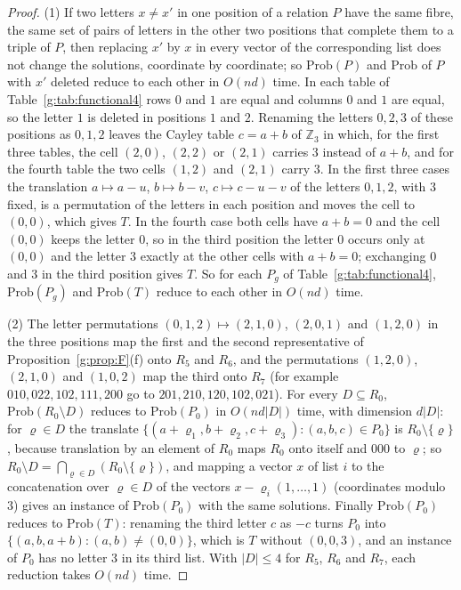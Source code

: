 \documentclass[11pt]{article}
\theoremstyle{definition}
\theoremstyle{remark}
\newcommand{\Z}{\mathbb{Z}}
\newcommand{\Prob}{\mathrm{Prob}}
\begin{document}
\begin{proof}
(1) If two letters $x\ne x'$ in one position of a relation $P$ have the same fibre, the same set of pairs of letters in the other two positions that complete them to a triple of $P$, then replacing $x'$ by $x$ in every vector of the corresponding list does not change the solutions, coordinate by coordinate; so $\Prob(P)$ and $\Prob$ of $P$ with $x'$ deleted reduce to each other in $O(nd)$ time. In each table of Table~\ref{g:tab:functional4} rows $0$ and $1$ are equal and columns $0$ and $1$ are equal, so the letter $1$ is deleted in positions $1$ and $2$. Renaming the letters $0,2,3$ of these positions as $0,1,2$ leaves the Cayley table $c=a+b$ of $\Z_3$ in which, for the first three tables, the cell $(2,0)$, $(2,2)$ or $(2,1)$ carries $3$ instead of $a+b$, and for the fourth table the two cells $(1,2)$ and $(2,1)$ carry $3$. In the first three cases the translation $a\mapsto a-u$, $b\mapsto b-v$, $c\mapsto c-u-v$ of the letters $0,1,2$, with $3$ fixed, is a permutation of the letters in each position and moves the cell to $(0,0)$, which gives $T$. In the fourth case both cells have $a+b=0$ and the cell $(0,0)$ keeps the letter $0$, so in the third position the letter $0$ occurs only at $(0,0)$ and the letter $3$ exactly at the other cells with $a+b=0$; exchanging $0$ and $3$ in the third position gives $T$. So for each $P_g$ of Table~\ref{g:tab:functional4}, $\Prob(P_g)$ and $\Prob(T)$ reduce to each other in $O(nd)$ time.

(2) The letter permutations $(0,1,2)\mapsto(2,1,0)$, $(2,0,1)$ and $(1,2,0)$ in the three positions map the first and the second representative of Proposition~\ref{g:prop:F}(f) onto $R_5$ and $R_6$, and the permutations $(1,2,0)$, $(2,1,0)$ and $(1,0,2)$ map the third onto $R_7$ (for example $010,022,102,111,200$ go to $201,210,120,102,021$). For every $D\subseteq R_0$, $\Prob(R_0\setminus D)$ reduces to $\Prob(P_0)$ in $O(nd|D|)$ time, with dimension $d|D|$: for $\varrho\in D$ the translate $\{(a+\varrho_1,b+\varrho_2,c+\varrho_3):(a,b,c)\in P_0\}$ is $R_0\setminus\{\varrho\}$, because translation by an element of $R_0$ maps $R_0$ onto itself and $000$ to $\varrho$; so $R_0\setminus D=\bigcap_{\varrho\in D}(R_0\setminus\{\varrho\})$, and mapping a vector $x$ of list $i$ to the concatenation over $\varrho\in D$ of the vectors $x-\varrho_i(1,\dots,1)$ (coordinates modulo $3$) gives an instance of $\Prob(P_0)$ with the same solutions. Finally $\Prob(P_0)$ reduces to $\Prob(T)$: renaming the third letter $c$ as $-c$ turns $P_0$ into $\{(a,b,a+b):(a,b)\ne(0,0)\}$, which is $T$ without $(0,0,3)$, and an instance of $P_0$ has no letter $3$ in its third list. With $|D|\le4$ for $R_5$, $R_6$ and $R_7$, each reduction takes $O(nd)$ time.


\end{proof}
\end{document}
